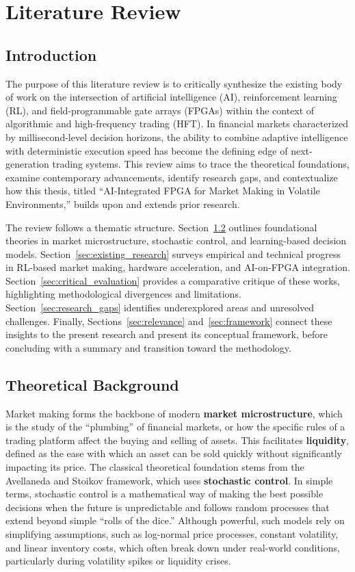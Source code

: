 \chapter{Literature Review}
\label{sec:literature_review}

\section{Introduction}
The purpose of this literature review is to critically synthesize the existing body of work on the intersection of artificial intelligence (AI), reinforcement learning (RL), and field-programmable gate arrays (FPGAs) within the context of algorithmic and high-frequency trading (HFT). In financial markets characterized by millisecond-level decision horizons, the ability to combine adaptive intelligence with deterministic execution speed has become the defining edge of next-generation trading systems. This review aims to trace the theoretical foundations, examine contemporary advancements, identify research gaps, and contextualize how this thesis, titled ``AI-Integrated FPGA for Market Making in Volatile Environments,'' builds upon and extends prior research.

The review follows a thematic structure. Section~\ref{sec:theory_background} outlines foundational theories in market microstructure, stochastic control, and learning-based decision models. Section~\ref{sec:existing_research} surveys empirical and technical progress in RL-based market making, hardware acceleration, and AI-on-FPGA integration. Section~\ref{sec:critical_evaluation} provides a comparative critique of these works, highlighting methodological divergences and limitations. Section~\ref{sec:research_gaps} identifies underexplored areas and unresolved challenges. Finally, Sections~\ref{sec:relevance} and~\ref{sec:framework} connect these insights to the present research and present its conceptual framework, before concluding with a summary and transition toward the methodology.

\section{Theoretical Background}
\label{sec:theory_background}
Market making forms the backbone of modern \textbf{market microstructure}, which is the study of the ``plumbing'' of financial markets, or how the specific rules of a trading platform affect the buying and selling of assets. This facilitates \textbf{liquidity}, defined as the ease with which an asset can be sold quickly without significantly impacting its price. The classical theoretical foundation stems from the Avellaneda and Stoikov framework, which uses \textbf{stochastic control}. In simple terms, stochastic control is a mathematical way of making the best possible decisions when the future is unpredictable and follows random processes that extend beyond simple ``rolls of the dice.''
 Although powerful, such models rely on simplifying assumptions, such as log-normal price processes, constant volatility, and linear inventory costs, which often break down under real-world conditions, particularly during volatility spikes or liquidity crises.

